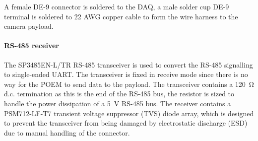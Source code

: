 \documentclass{report}
\begin{document}
A female DE-9 connector is soldered to the DAQ, a male solder cup DE-9 terminal is soldered to 22 AWG copper cable to form the wire harness to the camera payload.

\paragraph{RS-485 receiver}
The SP3485EN-L/TR RS-485 transceiver is used to convert the RS-485 signalling to single-ended UART. The transceiver is fixed in receive mode since there is no way for the POEM to send data to the payload. The transceiver contains a \SI{120}{\ohm} d.c. termination as this is the end of the RS-485 bus, the resistor is sized to handle the power dissipation of a \SI{5}{\volt} RS-485 bus. The receiver contains a PSM712-LF-T7 transient voltage suppressor (TVS) diode array, which is designed to prevent the transceiver from being damaged by electrostatic discharge (ESD) due to manual handling of the connector.
\end{document}
